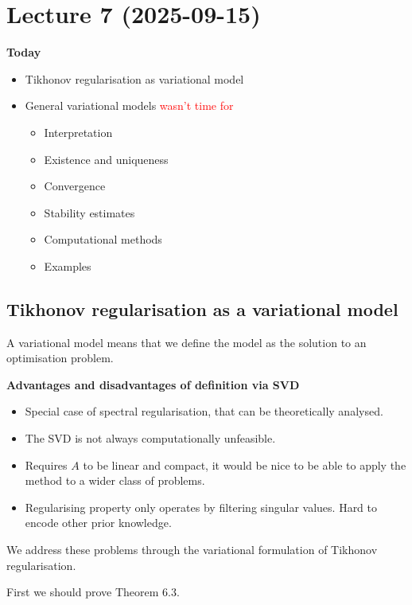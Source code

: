 \documentclass[12pt]{article}
\theoremstyle{definition}
\begin{document}
\section{Lecture 7 (2025-09-15)}
\textbf{Today}
\begin{itemize}
    \item Tikhonov regularisation as variational model
    \item General variational models \textcolor{red}{wasn't time for}
    \begin{itemize}
        \item Interpretation
        \item Existence and uniqueness
        \item Convergence
        \item Stability estimates
        \item Computational methods
        \item Examples
    \end{itemize}
\end{itemize}

\subsection{Tikhonov regularisation as a variational model}
A variational model means that we define the model as the solution to an optimisation problem.

\textbf{Advantages and disadvantages of definition via SVD}

\begin{itemize}[label=($\boldsymbol{+}$)]
    \item Special case of spectral regularisation, that can be theoretically analysed.
\end{itemize}
\begin{itemize}[label=$(\boldsymbol{-})$]
    \item The SVD is not always computationally unfeasible.
    \item Requires $A$ to be linear and compact, it would be nice to be able to apply the method to a wider class of problems.
    \item Regularising property only operates by filtering singular values. Hard to encode other prior knowledge.
\end{itemize}

We address these problems through the variational formulation of Tikhonov regularisation.

First we should prove Theorem 6.3.
\end{document}
